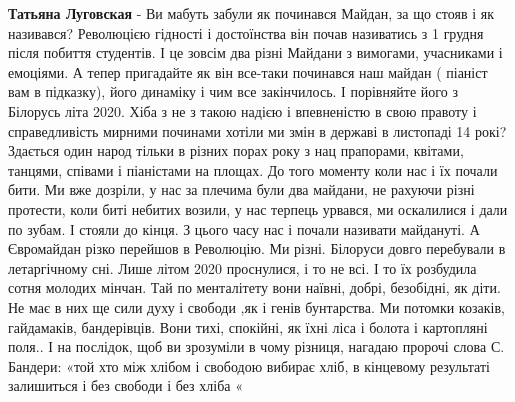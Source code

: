 \begin{multicols}{2}
\begin{itemize}
\textbf{Татьяна Луговская} - Ви мабуть забули як починався Майдан, за що стояв
і як називався? Революцією гідності і достоїнства він почав називатись з 1
грудня після побиття студентів. І це зовсім два різні Майдани з вимогами,
учасниками і емоціями. А тепер пригадайте як він все-таки починався наш майдан
( піаніст вам в підказку), його динаміку і чим все закінчилось. І порівняйте
його з Білорусь літа 2020. Хіба з не з такою надією і впевненістю в свою
правоту і справедливість мирними починами хотіли ми змін в державі в листопаді
14 рокі? Здається один народ тільки в різних порах року з нац прапорами,
квітами, танцями, співами і піаністами на площах. До того моменту коли нас і їх
почали бити. Ми вже дозріли, у нас за плечима були два майдани, не рахуючи
різні протести, коли биті небитих возили, у нас терпець урвався, ми оскалилися
і дали по зубам. І стояли до кінця. З цього часу нас і почали називати
майдануті. А Євромайдан різко перейшов в Революцію. Ми різні. Білоруси довго
перебували в летаргічному сні. Лише літом 2020 проснулися, і то не всі. І то їх
розбудила сотня молодих мінчан. Тай по менталітету вони наївні, добрі,
безобідні, як діти. Не має в них ще сили духу і свободи ,як і генів бунтарства.
Ми потомки козаків, гайдамаків, бандерівців. Вони тихі, спокійні, як їхні ліса
і болота і картопляні поля.. І на послідок, щоб ви зрозуміли в чому різниця,
нагадаю пророчі слова С. Бандери: «той хто між хлібом і свободою вибирає хліб, в
кінцевому результаті залишиться і без свободи і без хліба « 

\end{itemize} %


\end{multicols}
